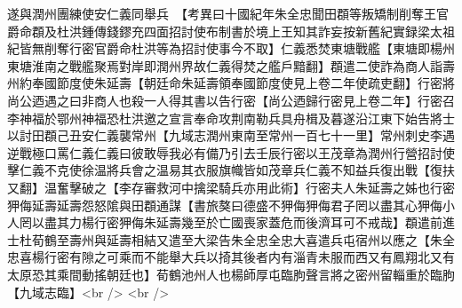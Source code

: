 遂與潤州團練使安仁義同舉兵　【考異曰十國紀年朱全忠聞田頵等叛矯制削奪王官爵命頵及杜洪鍾傳錢鏐充四面招討使布制書於境上王知其詐妄按新舊紀實録梁太祖紀皆無削奪行密官爵命杜洪等為招討使事今不取】仁義悉焚東塘戰艦【東塘即楊州東塘淮南之戰艦聚焉對岸即潤州界故仁義得焚之艦戶黯翻】頵遣二使詐為商人詣壽州約奉國節度使朱延壽【朝廷命朱延壽領奉國節度使見上卷二年使疏吏翻】行密將尚公迺遇之曰非商人也殺一人得其書以告行密【尚公迺歸行密見上卷二年】行密召李神福於鄂州神福恐杜洪邀之宣言奉命攻荆南勒兵具舟楫及暮遂沿江東下始告將士以討田頵己丑安仁義襲常州【九域志潤州東南至常州一百七十一里】常州刺史李遇逆戰極口罵仁義仁義曰彼敢辱我必有備乃引去壬辰行密以王茂章為潤州行營招討使擊仁義不克使徐温將兵會之温易其衣服旗幟皆如茂章兵仁義不知益兵復出戰【復扶又翻】温奮擊破之【李存審救河中擒梁騎兵亦用此術】行密夫人朱延壽之姊也行密狎侮延壽延壽怨怒隂與田頵通謀【書旅獒曰德盛不狎侮狎侮君子罔以盡其心狎侮小人罔以盡其力楊行密狎侮朱延壽幾至於亡國喪家蓋危而後濟耳可不戒哉】頵遣前進士杜荀鶴至壽州與延壽相結又遣至大梁告朱全忠全忠大喜遣兵屯宿州以應之【朱全忠喜楊行密有隙之可乘而不能舉大兵以掎其後者内有淄青未服而西又有鳳翔北又有太原恐其乘間動搖朝廷也】荀鶴池州人也楊師厚屯臨朐聲言將之密州留輜重於臨朐【九域志臨】<br />
<br />
